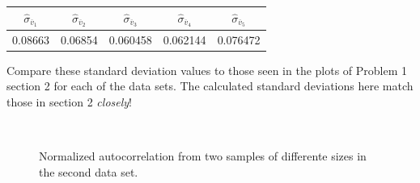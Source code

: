 \documentclass[singlepage,notitlepage,nofootinbib,11pt]{revtex4-1}
\begin{document}
\begin{center}
\begin{tabular}{ | c | c | c | c | c |}\hline
  $\hat{\sigma}_{\overline{v}_1}$ &  $\hat{\sigma}_{\overline{v}_2}$ &  $\hat{\sigma}_{\overline{v}_3}$ &  $\hat{\sigma}_{\overline{v}_4}$ &  $\hat{\sigma}_{\overline{v}_5}$  \\ \hline \hline 
  0.08663 & 0.06854 & 0.060458 & 0.062144 & 0.076472 \\ \hline
\end{tabular}
\end{center}
Compare these standard deviation values to those seen in the plots of Problem 1 section 2 for each of the data sets. The calculated standard deviations here match those in section 2 {\it closely}!
\begin{figure}[h]
\centering
  \captionsetup[subfigure]{labelformat=empty}
  \\
\caption{\label{ok} Normalized autocorrelation from two samples of differente sizes in the second data set.}
\end{figure}
\end{document}
